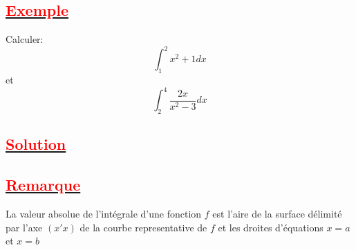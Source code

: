 \documentclass[12pt]{article}
\begin{document}
\subsection*{\underline{\textbf{\textcolor{red}{Exemple}}}}
Calculer:
\[\int_{1}^{2}x^{2}+1dx\] et \[\int_{2}^{4}\frac{2x}{x^{2}-3} dx\]
\subsection*{\underline{\textbf{\textcolor{red}{Solution}}}}
\subsection*{\underline{\textbf{\textcolor{red}{Remarque}}}}
La valeur absolue de l'intégrale d'une fonction $f$ est l'aire de la surface délimité par l'axe $(x'x)$ de la courbe representative de $f$ et les droites d'équations $x=a$ et $x=b$
\end{document}
